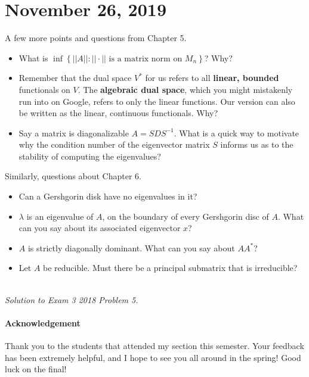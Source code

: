 \documentclass[11pt]{article}
\theoremstyle{plain}
\theoremstyle{definition}
\theoremstyle{remark}
\begin{document}
\section{November 26, 2019}

A few more points and questions from Chapter 5.
\begin{itemize}
    \item What is $\inf\left\{||A||: ||\cdot|| \text{ is a matrix norm on } M_n\right\}$? Why?
    \item Remember that the dual space $V^*$ for us refers to all {\bf linear, bounded} functionals on $V$. The {\bf algebraic dual space}, which you might mistakenly run into on Google, refers to only the linear functions. Our version can also be written as the linear, continuous functionals. Why?
    \item Say a matrix is diagonalizable $A = SDS^{-1}$. What is a quick way to motivate why the condition number of the eigenvector matrix $S$ informs us as to the stability of computing the eigenvalues?
\end{itemize}
Similarly, questions about Chapter 6.
\begin{itemize}
    \item Can a Gershgorin disk have no eigenvalues in it?
    \item $\lambda$ is an eigenvalue of $A$, on the boundary of every Gershgorin disc of $A$. What can you say about its associated eigenvector $x$?
    \item $A$ is strictly diagonally dominant. What can you say about $AA^*$?
    \item Let $A$ be reducible. Must there be a principal submatrix that is irreducible?
\end{itemize}

\\
{\it Solution to Exam 3 2018 Problem 5.}

\paragraph{Acknowledgement} Thank you to the students that attended my section this semester. Your feedback has been extremely helpful, and I hope to see you all around in the spring! Good luck on the final!

\newpage

\vspace{5mm}

%


\newpage
\end{document}

